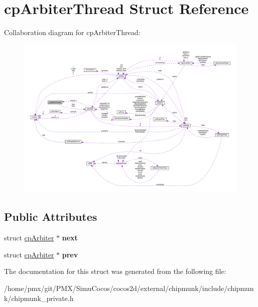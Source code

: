 \hypertarget{structcpArbiterThread}{}\section{cp\+Arbiter\+Thread Struct Reference}
\label{structcpArbiterThread}


Collaboration diagram for cp\+Arbiter\+Thread\+:
\nopagebreak
\begin{figure}[H]
\begin{center}
\leavevmode
\includegraphics[width=350pt]{structcpArbiterThread__coll__graph}
\end{center}
\end{figure}
\subsection*{Public Attributes}
\begin{DoxyCompactItemize}
\item 
\mbox{\label{structcpArbiterThread_a18e82e69fbbd4a8ee0003e3fbd6bcd9c}} 
struct \hyperlink{structcpArbiter}{cp\+Arbiter} $\ast$ {\bfseries next}
\item 
\mbox{\label{structcpArbiterThread_af85aac7e35c26147d4f4864a2b6f27fe}} 
struct \hyperlink{structcpArbiter}{cp\+Arbiter} $\ast$ {\bfseries prev}
\end{DoxyCompactItemize}


The documentation for this struct was generated from the following file\+:\begin{DoxyCompactItemize}
\item 
/home/pmx/git/\+P\+M\+X/\+Simu\+Cocos/cocos2d/external/chipmunk/include/chipmunk/chipmunk\+\_\+private.\+h\end{DoxyCompactItemize}
